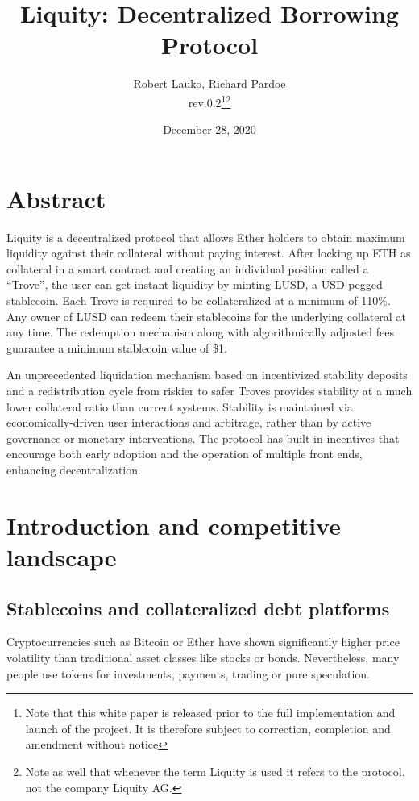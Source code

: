 \documentclass{article}
\begin{document}
\title{\textbf{Liquity: Decentralized Borrowing Protocol}}
\author{Robert Lauko, Richard Pardoe \\ rev.0.2\footnote{Note that this white paper is released prior to the full implementation and launch of the project. It is therefore subject to correction, completion and amendment without notice}\footnote{Note as well that whenever the term Liquity is used it refers to the protocol, not the company Liquity AG.}}
\date{December 28, 2020}

\maketitle

\section*{Abstract}
Liquity is a decentralized protocol that allows Ether holders to obtain maximum liquidity against their collateral without paying interest. After locking up ETH as collateral in a smart contract and creating an individual position called a “Trove”, the user can get instant liquidity by minting LUSD, a USD-pegged stablecoin. Each Trove is required to be collateralized at a minimum of 110\%. Any owner of LUSD can redeem their stablecoins for the underlying collateral at any time. The redemption mechanism along with algorithmically adjusted fees guarantee a minimum stablecoin value of \$1. 

An unprecedented liquidation mechanism based on incentivized stability deposits and a redistribution cycle from riskier to safer Troves provides stability at a much lower collateral ratio than current systems. Stability is maintained via economically-driven user interactions and arbitrage, rather than by active governance or monetary interventions. 
The protocol has built-in incentives that encourage both early adoption and the operation of multiple front ends, enhancing decentralization.

\newpage

\tableofcontents

\section{Introduction and competitive landscape}

\subsection{Stablecoins and collateralized debt platforms}
Cryptocurrencies such as Bitcoin or Ether have shown significantly higher price volatility than traditional asset classes like stocks or bonds. Nevertheless, many people use tokens for investments, payments, trading or pure speculation.
\end{document}
